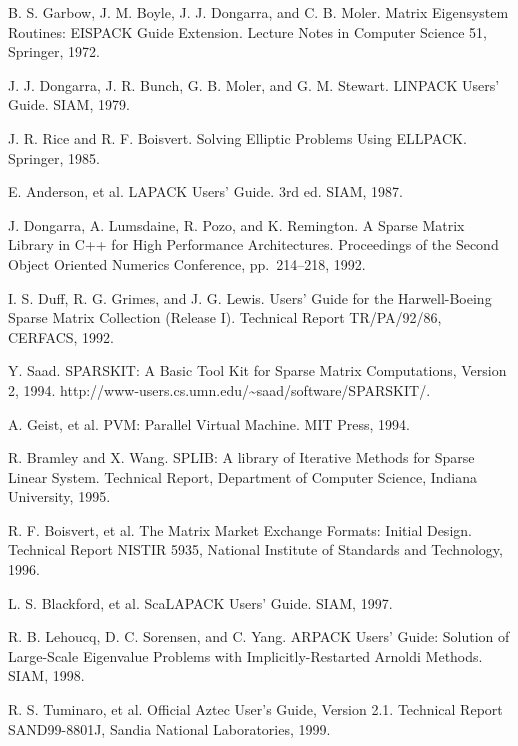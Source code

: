 \documentclass[a4paper]{jarticle}
\begin{document}
{\begin{thebibliography}{10}
B. S. Garbow, J. M. Boyle, J. J. Dongarra, and C. B. Moler.
\newblock Matrix Eigensystem Routines: EISPACK Guide Extension.
\newblock Lecture Notes in Computer Science 51, Springer, 1972.

J. J. Dongarra, J. R. Bunch, G. B. Moler, and G. M. Stewart.
\newblock LINPACK Users' Guide.
\newblock SIAM, 1979.

J. R. Rice and R. F. Boisvert.
\newblock Solving Elliptic Problems Using ELLPACK.
\newblock Springer, 1985.

E. Anderson, et al. 
\newblock LAPACK Users' Guide. 3rd ed.
\newblock SIAM, 1987.

J. Dongarra, A. Lumsdaine, R. Pozo, and K. Remington.
\newblock A Sparse Matrix Library in C++ for High Performance Architectures.
\newblock Proceedings of the Second Object Oriented Numerics Conference,
	pp.\ 214--218, 1992.

I. S. Duff, R. G. Grimes, and J. G. Lewis.
\newblock Users' Guide for the Harwell-Boeing Sparse Matrix Collection
(Release I).
\newblock Technical Report TR/PA/92/86, CERFACS, 1992.

Y. Saad.
\newblock SPARSKIT: A Basic Tool Kit for Sparse Matrix Computations,
  Version 2, 1994.
\newblock http://www-users.cs.umn.edu/\textasciitilde saad/software/SPARSKIT/.

A. Geist, et al.
\newblock PVM: Parallel Virtual Machine.
\newblock MIT Press, 1994.

R. Bramley and X. Wang.
\newblock SPLIB: A library of Iterative Methods for Sparse Linear System.
\newblock Technical Report, Department of Computer Science, Indiana University, 1995.

R. F. Boisvert, et al. 
\newblock The Matrix Market Exchange Formats: Initial Design. 
\newblock Technical Report NISTIR 5935, National Institute of Standards and
	Technology, 1996.

L. S. Blackford, et al.
\newblock ScaLAPACK Users' Guide.
\newblock SIAM, 1997.

R. B. Lehoucq, D. C. Sorensen, and C. Yang.
\newblock ARPACK Users' Guide: Solution of Large-Scale Eigenvalue Problems with Implicitly-Restarted Arnoldi Methods. 
\newblock SIAM, 1998. 

R. S. Tuminaro, et al.
\newblock Official Aztec User's Guide, Version 2.1.
\newblock Technical Report SAND99-8801J, Sandia National Laboratories, 1999.


\end{thebibliography}}
\end{document}
